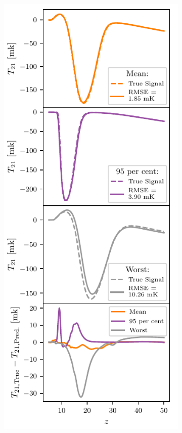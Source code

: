 \begin{figure}
    \centering
    \begin{subfigure}{0.5\textwidth}
        \includegraphics{globalemu/figs/test_best_worst_T.pdf}
    \end{subfigure}%
    \begin{subfigure}{0.5\textwidth}

\end{subfigure}
\end{figure}
